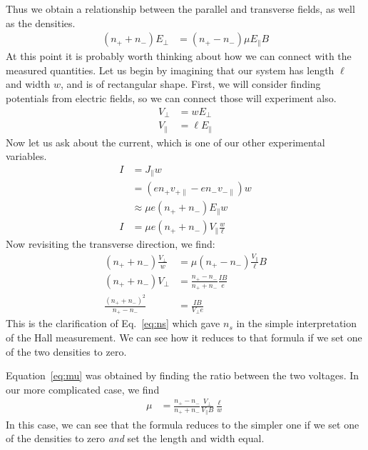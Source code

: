 \documentclass[twocolumn]{revtex4-1}
\begin{document}
Thus we obtain a relationship between the parallel and transverse
fields, as well as the densities.
\begin{align}
  (n_+ + n_-) E_\perp &= (n_+ - n_-)\mu E_\parallel B
\end{align}
At this point it is probably worth thinking about how we can connect
with the measured quantities.  Let us begin by imagining that our
system has length $\ell$ and width $w$, and is of rectangular shape.
First, we will consider finding potentials from electric fields, so we
can connect those will experiment also.
\begin{align}
  V_\perp &= w E_\perp \\
  V_\parallel &= \ell E_\parallel
\end{align}
Now let us ask about the current, which is one of our other
experimental variables.
\begin{align}
  I &= J_\parallel w \\
  &= (en_+v_{+\parallel} - e n_-v_{-\parallel})w \\
  &\approx \mu e (n_+ + n_-) E_\parallel w \\
  I &= \mu e (n_+ + n_-) V_\parallel \frac{w}{\ell}
\end{align}
Now revisiting the transverse direction, we find:
\begin{align}
  (n_+ + n_-) \frac{V_\perp}{w} &= \mu (n_+ - n_-)\frac{V_\parallel}{\ell} B \\
  (n_+ + n_-) V_\perp &= \frac{n_+ - n_-}{n_+ + n_-}\frac{IB}{e} \\
  \frac{(n_+ + n_-)^2}{n_+ - n_-} &= \frac{IB}{V_\perp e}
\end{align}
This is the clarification of Eq.~\ref{eq:ns} which gave $n_s$ in the
simple interpretation of the Hall measurement.  We can see how it
reduces to that formula if we set one of the two densities to zero.

Equation~\ref{eq:mu} was obtained by finding the ratio between the two
voltages.  In our more complicated case, we find
\begin{align}
  \mu &= \frac{n_+ - n_-}{n_+ + n_-}\frac{V_\perp}{V_\parallel B}\frac{\ell}{w}
\end{align}
In this case, we can see that the formula reduces to the simpler one
if we set one of the densities to zero \emph{and} set the length and
width equal.
\end{document}
